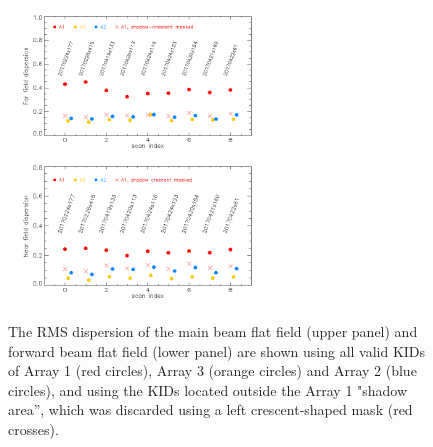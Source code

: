 \begin{figure}[ht] 
\begin{center}
  \includegraphics[width=0.6\textwidth]{Figures/FlatFields/Dispersion_main_beam_flat_field_N2R9_10_.png}
  \includegraphics[width=0.6\textwidth]{Figures/FlatFields/Dispersion_forward_beam_flat_field_N2R9_10_.png}
\caption[Dispersion of the flat field for nine \bms.]{The RMS
  dispersion of the main beam flat field (upper panel) and forward beam flat
  field (lower panel) are shown using all valid KIDs of Array 1 (red circles),
  Array 3 (orange circles) and Array 2 (blue circles), and using the KIDs
  located outside the Array 1 "shadow area'', which was discarded using a left
  crescent-shaped mask (red crosses).}
 \label{fig:stddev_ff}
\end{center}
\end{figure}
